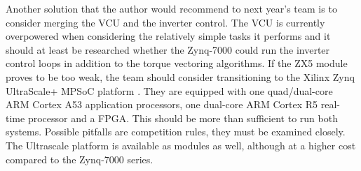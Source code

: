 Another solution that the author would recommend to next year's team is to consider merging the VCU and the inverter control. The VCU is currently overpowered when considering the relatively simple tasks it performs and it should at least be researched whether the Zynq-7000 could run the inverter control loops in addition to the torque vectoring algorithms. If the ZX5 module proves to be too weak, the team should consider transitioning to the Xilinx Zynq UltraScale+ MPSoC platform \cite{ultrascale}. They are equipped with one quad/dual-core ARM Cortex A53 application processors, one dual-core ARM Cortex R5 real-time processor and a FPGA. This should be more than sufficient to run both systems. Possible pitfalls are competition rules, they must be examined closely. The Ultrascale platform is available as modules as well, although at a higher cost compared to the Zynq-7000 series.


